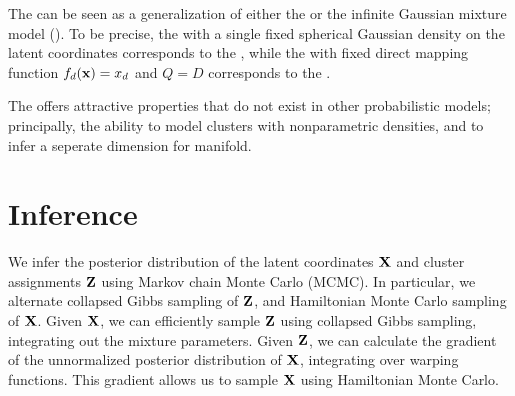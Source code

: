 The \iwmm{} can be seen as a generalization of either the \gplvm{} or the infinite Gaussian mixture model (\iGMM{}).
To be precise, the \iwmm{} with a single fixed spherical Gaussian density on the latent coordinates corresponds to the \gplvm{}, while the \iwmm{} with fixed direct mapping function $f_{d}({\bf{x}})=x_{d}$ and 
$Q=D$ corresponds to the \iGMM{}.

The \iwmm{} offers attractive properties that do not exist in other probabilistic models; principally, the ability to model clusters with nonparametric densities, and to infer a seperate dimension for manifold.





\section{Inference}

We infer the posterior distribution of the latent coordinates $\mathbf{X}$ and cluster assignments $\mathbf{Z}$ using Markov chain Monte Carlo (MCMC).
In particular, we alternate collapsed Gibbs sampling of $\mathbf{Z}$, and Hamiltonian Monte Carlo sampling of $\mathbf{X}$.
Given $\mathbf{X}$,
we can efficiently sample $\mathbf{Z}$ using collapsed Gibbs sampling, integrating out the mixture parameters.
Given $\mathbf{Z}$, we can calculate the gradient of the unnormalized posterior distribution of $\mathbf{X}$, integrating over warping functions.
This gradient allows us to sample $\mathbf{X}$ using Hamiltonian Monte Carlo.

